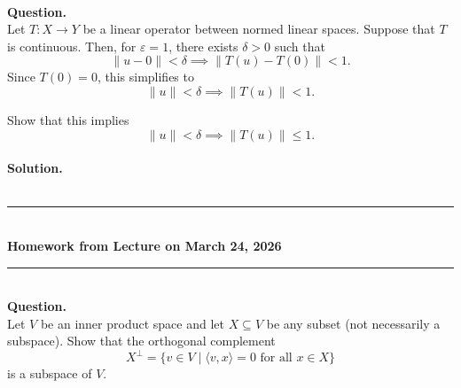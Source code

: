 \documentclass{article}
\begin{document}
\bigskip

\hfill \break  $~\!\!$ \dotfill \medskip \\
\textbf{Question.}\\
Let $T: X \to Y$ be a linear operator between normed linear spaces. Suppose that $T$ is continuous. Then, for $\varepsilon = 1$, there exists $\delta > 0$ such that
\[
\|u - 0\| < \delta \implies \|T(u) - T(0)\| < 1.
\]
Since $T(0) = 0$, this simplifies to
\[
\|u\| < \delta \implies \|T(u)\| < 1.
\]

Show that this implies
\[
\|u\| < \delta \implies \|T(u)\| \le 1.
\]
\noindent\\
\textbf{Solution.}\\
\quad\\
\noindent{}

\bigskip
\begin{center}
\rule{0.5\textwidth}{1pt}\\[6pt]
\textbf{Homework from Lecture on March 24, 2026}\\[2pt]
\rule{0.5\textwidth}{1pt}
\end{center}
\bigskip

\hfill \break  $~\!\!$ \dotfill \medskip \\
\textbf{Question.}\\
Let $V$ be an inner product space and let $X \subseteq V$ be any subset (not necessarily a subspace). Show that the orthogonal complement
\[
X^\perp = \{ v \in V \mid \langle v, x \rangle = 0 \text{ for all } x \in X \}
\]
is a subspace of $V$.
\end{document}
